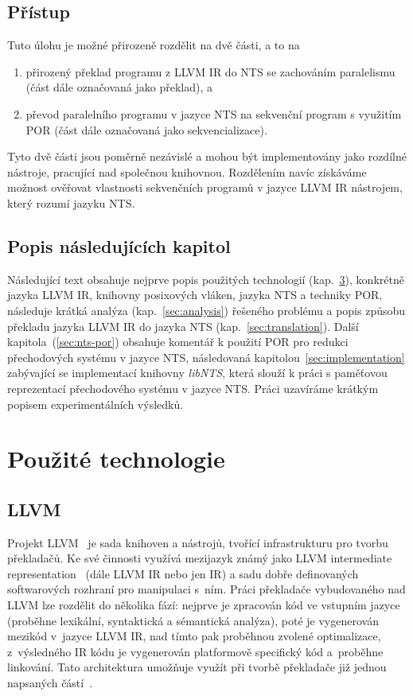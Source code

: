 \documentclass[12pt]{fithesis2}
\begin{document}
\section{Přístup}
Tuto úlohu je možné přirozeně rozdělit na dvě části, a to na
\begin{enumerate}
\item přirozený překlad programu z LLVM IR do NTS se zachováním paralelismu (část dále označovaná jako překlad), a
\item převod paralelního programu v jazyce NTS na sekvenční program s využitím POR (část dále označovaná jako sekvencializace).
\end{enumerate}
Tyto dvě části jsou poměrně nezávislé a mohou být implementovány jako rozdílné nástroje, pracující nad společnou knihovnou. Rozdělením navíc získáváme možnost ověřovat vlastnosti sekvenčních programů v jazyce LLVM IR nástrojem, který rozumí jazyku NTS.



\section{Popis následujících kapitol}
Následující text obsahuje nejprve popis použitých technologií (kap.~\ref{sec:technologies}), konkrétně jazyka LLVM IR, knihovny posixových vláken, jazyka NTS a techniky POR, následuje krátká analýza (kap.~\ref{sec:analysis}) řešeného problému a popis způsobu překladu jazyka LLVM IR do jazyka NTS (kap.~\ref{sec:translation}). Další kapitola~(\ref{sec:nts-por}) obsahuje komentář k použití POR pro redukci přechodových systému v jazyce NTS, následovaná kapitolou~\ref{sec:implementation} zabývající se implementací knihovny \textit{libNTS}, která slouží k práci s paměťovou reprezentací přechodového systému v jazyce NTS. Práci uzavíráme krátkým popisem experimentálních výsledků.



\chapter{Použité technologie}
\label{sec:technologies}
\section{LLVM}
Projekt LLVM~\cite{LLVM} je sada knihoven a nástrojů, tvořící infrastrukturu pro tvorbu překladačů. Ke své činnosti využívá mezijazyk známý jako LLVM intermediate representation~\cite{LLVM-langRef} (dále LLVM IR nebo jen IR) a sadu dobře definovaných softwarových rozhraní pro manipulaci s~ním. Práci překladače vybudovaného nad LLVM lze rozdělit do několika fází: nejprve je zpracován kód ve vstupním jazyce (proběhne lexikální, syntaktická a sémantická analýza), poté je vygenerován mezikód v~jazyce LLVM IR, nad tímto pak proběhnou zvolené optimalizace, z~výsledného IR kódu je vygenerován platformově specifický kód a~proběhne linkování. Tato architektura umožňuje využít při tvorbě překladače již jednou napsaných částí~\cite{AOSABOOK-LLVM}.
\end{document}
